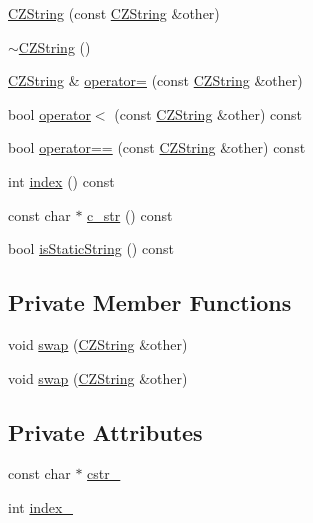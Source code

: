 \begin{DoxyCompactItemize}
\item 
\hyperlink{classJson_1_1Value_1_1CZString_a4e3e7c07855ecf7a20417dedd6790947}{C\-Z\-String} (const \hyperlink{classJson_1_1Value_1_1CZString}{C\-Z\-String} \&other)
\item 
\hyperlink{classJson_1_1Value_1_1CZString_add6989dc7073646b95e5ebacb3f07d51}{$\sim$\-C\-Z\-String} ()
\item 
\hyperlink{classJson_1_1Value_1_1CZString}{C\-Z\-String} \& \hyperlink{classJson_1_1Value_1_1CZString_a06925d591132ed7f2e128bdfd62424fc}{operator=} (const \hyperlink{classJson_1_1Value_1_1CZString}{C\-Z\-String} \&other)
\item 
bool \hyperlink{classJson_1_1Value_1_1CZString_a1fdef0752c6ffe3cd61f227f869d2735}{operator$<$} (const \hyperlink{classJson_1_1Value_1_1CZString}{C\-Z\-String} \&other) const 
\item 
bool \hyperlink{classJson_1_1Value_1_1CZString_a69bb79f479d2b67966549107a94e46d2}{operator==} (const \hyperlink{classJson_1_1Value_1_1CZString}{C\-Z\-String} \&other) const 
\item 
int \hyperlink{classJson_1_1Value_1_1CZString_aa4c7e02fa4c8e590e9b5ff4fb90de5a4}{index} () const 
\item 
const char $\ast$ \hyperlink{classJson_1_1Value_1_1CZString_ab2f97c5688e28d8a9e3e5ca16bf3b324}{c\-\_\-str} () const 
\item 
bool \hyperlink{classJson_1_1Value_1_1CZString_af3cc02b77c2cd79d4646fcea3575c1fd}{is\-Static\-String} () const 
\end{DoxyCompactItemize}
\subsection*{Private Member Functions}
\begin{DoxyCompactItemize}
\item 
void \hyperlink{classJson_1_1Value_1_1CZString_ad59f3542d2eea749a6a63409d1a02207}{swap} (\hyperlink{classJson_1_1Value_1_1CZString}{C\-Z\-String} \&other)
\item 
void \hyperlink{classJson_1_1Value_1_1CZString_ad59f3542d2eea749a6a63409d1a02207}{swap} (\hyperlink{classJson_1_1Value_1_1CZString}{C\-Z\-String} \&other)
\end{DoxyCompactItemize}
\subsection*{Private Attributes}
\begin{DoxyCompactItemize}
\item 
const char $\ast$ \hyperlink{classJson_1_1Value_1_1CZString_a16da56821a29e3a4cbe2d71b4f8d6995}{cstr\-\_\-}
\item 
int \hyperlink{classJson_1_1Value_1_1CZString_aa061d02bc98d883524a99f4c2279fd89}{index\-\_\-}
\end{DoxyCompactItemize}


